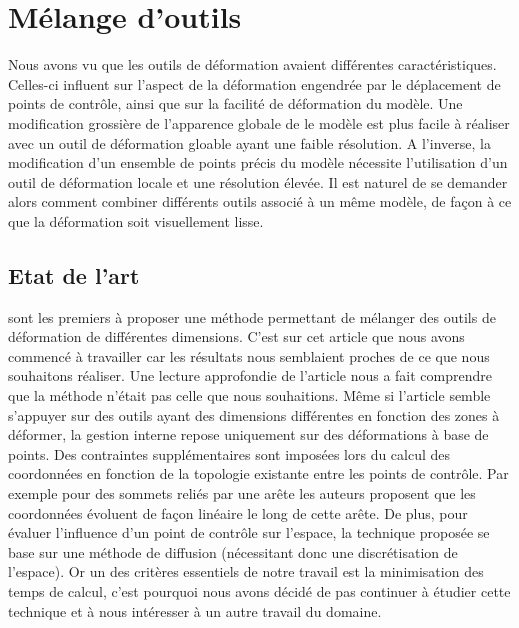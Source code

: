 

\chapter{Mélange d'outils}

\graphicspath{ {Chapter3/Chapter3Figs/PNG/}
  {Chapter3/Chapter3Figs/PDF/} {Chapter3/Chapter3Figs/} }

Nous avons vu que les outils de déformation avaient différentes
caractéristiques. Celles-ci influent sur l'aspect de la déformation engendrée
par le déplacement de points de contrôle, ainsi que sur la facilité de
déformation du modèle. Une modification grossière de l'apparence globale de le
modèle est plus facile à réaliser avec un outil de déformation gloable ayant
une faible résolution. A l'inverse, la modification d'un ensemble de points
précis du modèle nécessite l'utilisation d'un outil de déformation locale et
une résolution élevée. Il est naturel de se demander alors comment combiner
différents outils associé à un même modèle, de façon à ce que la déformation
soit visuellement lisse.

\section{Etat de l'art}

\cite{JBPS11} sont les premiers à proposer une méthode permettant de mélanger
des outils de déformation de différentes dimensions. C'est sur cet article que
nous avons commencé à travailler car les résultats nous semblaient proches de
ce que nous souhaitons réaliser. Une lecture approfondie de l'article nous a
fait comprendre que la méthode n'était pas celle que nous souhaitions. Même si
l'article semble s'appuyer sur des outils ayant des dimensions différentes en
fonction des zones à déformer, la gestion interne repose uniquement sur des
déformations à base de points. Des contraintes supplémentaires sont imposées
lors du calcul des coordonnées en fonction de la topologie existante entre les
points de contrôle. Par exemple pour des sommets reliés par une arête les
auteurs proposent que les coordonnées évoluent de façon linéaire le long de
cette arête. De plus, pour évaluer l'influence d'un point de contrôle sur
l'espace, la technique proposée se base sur une méthode de diffusion
(nécessitant donc une discrétisation de l'espace). Or un des critères
essentiels de notre travail est la minimisation des temps de calcul, c'est
pourquoi nous avons décidé de pas continuer à étudier cette technique et à
nous intéresser à un autre travail du domaine.


